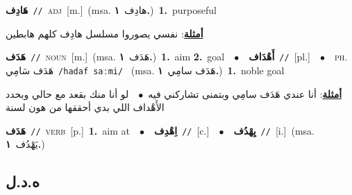 \documentclass[10pt,a4paper,twoside]{article} %
\begin{document}
\begin{multicols}{2}
{\setlength\topsep{0pt}\textbf{\foreignlanguage{arabic}{هَادِف}}\ {\color{gray}\texttt{//}\color{black}}\ \textsc{adj}\ [m.]\ \color{gray}(msa. \foreignlanguage{arabic}{هادِف}~\foreignlanguage{arabic}{\textbf{١.}})\color{black}\ \textbf{1.}~purposeful\  \begin{flushright}\color{gray}\foreignlanguage{arabic}{\textbf{\underline{\foreignlanguage{arabic}{أمثلة}}}: نفسي يصوروا مسلسل هادِف كلهم هابطين}\end{flushright}\color{black}} \vspace{2mm}

{\setlength\topsep{0pt}\textbf{\foreignlanguage{arabic}{هَدَف}}\ {\color{gray}\texttt{//}\color{black}}\ \textsc{noun}\ [m.]\ \color{gray}(msa. \foreignlanguage{arabic}{هَدَف}~\foreignlanguage{arabic}{\textbf{١.}})\color{black}\ \textbf{1.}~aim  \textbf{2.}~goal\ \ $\bullet$\ \ \setlength\topsep{0pt}\textbf{\foreignlanguage{arabic}{أَهْدَاف}}\ {\color{gray}\texttt{//}\color{black}}\ [pl.]\ \ $\bullet$\ \ \textsc{ph.} \color{gray} \foreignlanguage{arabic}{هَدَف سَامِي}\color{black}\ {\color{gray}\texttt{/{\sffamily hadaf saːmi}/}\color{black}}\ \color{gray} (msa. \foreignlanguage{arabic}{هَدَف سامِي}~\foreignlanguage{arabic}{\textbf{١.}})\color{black}\ \textbf{1.}~noble goal\  \begin{flushright}\color{gray}\foreignlanguage{arabic}{\textbf{\underline{\foreignlanguage{arabic}{أمثلة}}}: أنا عندي هَدَف سامِي وبتمنى تشاركني فيه\ $\bullet$\ \  لو أنا منك بقعد مع حالي وبحدد الأَهْداف اللي بدي أحققها من هون لسنة}\end{flushright}\color{black}} \vspace{2mm}

{\setlength\topsep{0pt}\textbf{\foreignlanguage{arabic}{هَدَف}}\ {\color{gray}\texttt{//}\color{black}}\ \textsc{verb}\ [p.]\ \textbf{1.}~aim at\ \ $\bullet$\ \ \setlength\topsep{0pt}\textbf{\foreignlanguage{arabic}{اِهْدِف}}\ {\color{gray}\texttt{//}\color{black}}\ [c.]\ \ $\bullet$\ \ \setlength\topsep{0pt}\textbf{\foreignlanguage{arabic}{يِهْدُف}}\ {\color{gray}\texttt{//}\color{black}}\ [i.]\ \color{gray}(msa. \foreignlanguage{arabic}{يَهْدُف}~\foreignlanguage{arabic}{\textbf{١.}})\color{black}\ } \vspace{2mm}

\vspace{-3mm}
\subsection*{\color{blue}\foreignlanguage{arabic}{ه.د.ل}\color{blue}{}} 


\end{multicols}
\end{document}

